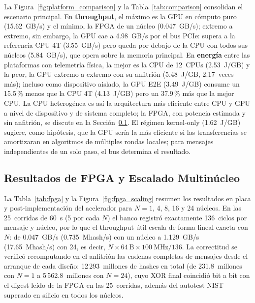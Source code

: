 \documentclass[conference]{IEEEtran}
\begin{document}
La Figura~\ref{fig:platform_comparison} y la Tabla~\ref{tab:comparison} consolidan el escenario principal. En \textbf{throughput}, el máximo es la GPU en cómputo puro (15.62~GB/s) y el mínimo, la FPGA de un núcleo (0.047~GB/s); extremo a extremo, sin embargo, la GPU cae a 4.98~GB/s por el bus PCIe: supera a la referencia CPU 4T (3.55~GB/s) pero queda por debajo de la CPU con todos sus núcleos (5.84~GB/s), que opera sobre la memoria principal. En \textbf{energía} entre las plataformas con telemetría física, la mejor es la CPU de 12~CPUs (2.53~J/GB) y la peor, la GPU extremo a extremo con su anfitrión (5.48~J/GB, 2.17~veces más); incluso como dispositivo aislado, la GPU E2E (3.49~J/GB) consume un 15.5\,\% menos que la CPU 4T (4.13~J/GB) pero un 37.9\,\% más que la mejor CPU. La CPU heterogénea es así la arquitectura más eficiente entre CPU y GPU a nivel de dispositivo y de sistema completo; la FPGA, con potencia estimada y sin anfitrión, se discute en la Sección~\ref{sec:fpga_results}. El régimen kernel-only (1.62~J/GB) sugiere, como hipótesis, que la GPU sería la más eficiente si las transferencias se amortizaran en algoritmos de múltiples rondas locales; para mensajes independientes de un solo paso, el bus determina el resultado.



\subsection{Resultados de FPGA y Escalado Multinúcleo}
\label{sec:fpga_results}

La Tabla~\ref{tab:fpga} y la Figura~\ref{fig:fpga_scaling} resumen los resultados en placa y post-implementación del acelerador para $N = 1$, 4, 8, 16 y 24 núcleos. En las 25~corridas de 60~s (5 por cada $N$) el banco registró exactamente 136~ciclos por mensaje y núcleo, por lo que el throughput útil escala de forma lineal exacta con $N$: de 0.047~GB/s (0.735~Mhash/s) con un núcleo a 1.129~GB/s (17.65~Mhash/s) con 24, es decir, $N \times 64~\text{B} \times 100~\text{MHz}/136$. La correctitud se verificó recomputando en el anfitrión las cadenas completas de mensajes desde el arranque de cada diseño: 12\,293~millones de hashes en total (de 231.8~millones con $N=1$ a 5\,562.8~millones con $N=24$), cuyo XOR final coincidió bit a bit con el digest leído de la FPGA en las 25~corridas, además del autotest NIST superado en silicio en todos los núcleos.
\end{document}
